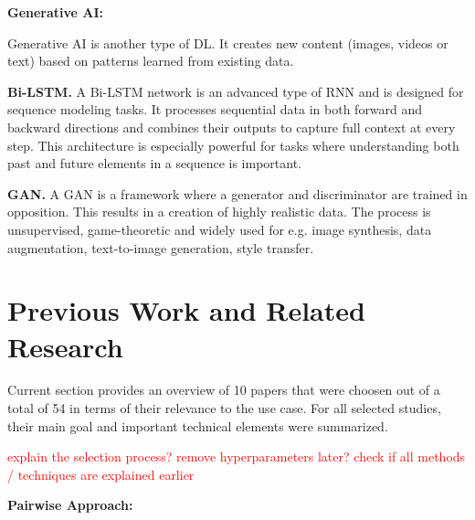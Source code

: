 \vspace{0.5cm}

\textbf{Generative AI:}

\vspace{0.5cm}

Generative AI is another type of \ac{DL}. It creates new content (images, videos or text) based on patterns learned from existing data.

\vspace{0.5cm}

\textbf{\ac{Bi-LSTM}.}
A \acs{Bi-LSTM} network is an advanced type of \acs{RNN} and is designed for sequence modeling tasks. It processes sequential data in both forward and backward directions and combines their outputs to capture full context at every step. This architecture is especially powerful for tasks where understanding both past and future elements in a sequence is important. \cite[cf.]{huang_bidirectional_2015}

\vspace{0.5cm}

\textbf{\ac{GAN}.}
A \acs{GAN} is a framework where a generator and discriminator are trained in opposition. This results in a creation of highly realistic data. The process is unsupervised, game-theoretic and widely used for e.g. image synthesis, data augmentation, text-to-image generation, style transfer. \cite[cf.]{goodfellow_generative_2014}

\section{Previous Work and Related Research}

Current section provides an overview of 10 papers that were choosen out of a total of 54 in terms of their relevance to the use case. For all selected studies, their main goal and important technical elements were summarized. \vspace{0.5cm}

\textcolor{red}{explain the selection process?}
\textcolor{red}{remove hyperparameters later?}
\textcolor{red}{check if all methods / techniques are explained earlier}

\vspace{0.5cm}

\textbf{Pairwise Approach:}

\vspace{0.5cm}

